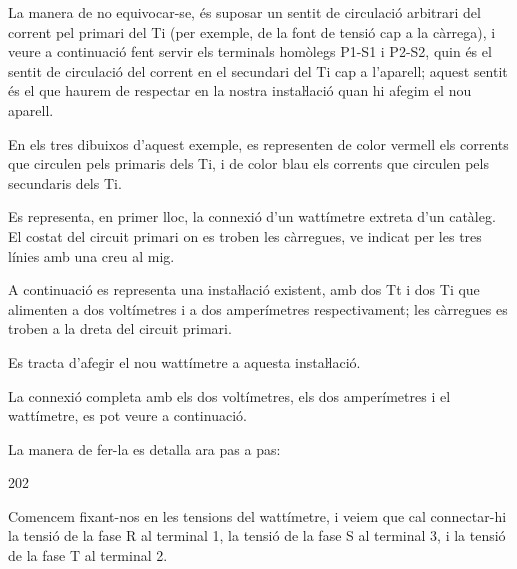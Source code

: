  La manera de no equivocar-se, és suposar un sentit de
circulació arbitrari del corrent  pel primari del Ti (per exemple,
de la font de tensió cap a la càrrega), i veure a continuació fent
servir els terminals homòlegs P1-S1 i P2-S2, quin és el sentit de
circulació del corrent en el secundari del Ti cap a l'aparell;
aquest sentit és el que haurem de respectar en la nostra
instaŀlació quan hi afegim el nou aparell.

	
\begin{exemple}[\ConnexWatt{}]
	\addcontentsxms{\ConnexWatt}
    En els tres dibuixos d'aquest exemple, es representen de color vermell els corrents que circulen pels primaris dels Ti, i de color blau els corrents que circulen pels secundaris dels Ti.

    Es representa, en primer lloc, la connexió d'un wattímetre extreta
    d'un catàleg.   El costat del circuit primari on es troben les càrregues, ve indicat
    per les tres línies amb una creu al mig.

    \begin{center}
        
    \end{center}

    A continuació es representa una instaŀlació existent, amb dos Tt i
    dos Ti que alimenten a dos voltímetres i a dos amperímetres
    respectivament; les càrregues es troben a la dreta del circuit
    primari.

    \begin{center}
        
    \end{center}

    Es tracta d'afegir el nou wattímetre a aquesta
    instaŀlació.

    La connexió completa amb els dos voltímetres, els dos amperímetres i el wattímetre, es pot veure a continuació.
    
      \begin{center}
    	
    \end{center}

    La manera de fer-la es detalla ara pas a pas:

    \begin{dingautolist}{202}

    \item Comencem fixant-nos en les tensions del wattímetre, i veiem que cal
    connectar-hi la tensió de la fase R al terminal 1, la tensió de la
    fase S al terminal 3, i la tensió de la fase T al terminal 2.


\end{dingautolist}
\end{exemple}
